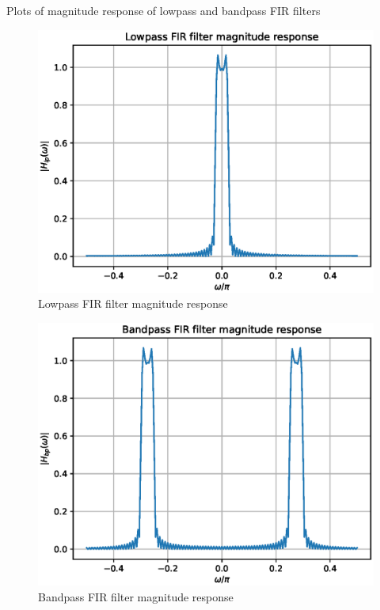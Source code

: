 \documentclass{beamer}
\begin{document}
\begin{frame}{Plots of magnitude response of lowpass and bandpass FIR filters}
\begin{figure}[!h]
\includegraphics[width=0.30\columnwidth]{./figs_fir/ee18btech11034_FIR_Lowpass.eps}
\caption{Lowpass FIR filter magnitude response}
\label{fig:Figure10}
\end{figure}

\begin{figure}[!h]
\includegraphics[width=0.30\columnwidth]{./figs_fir/ee18btech11034_FIR_Bandpass.eps}
\caption{Bandpass FIR filter magnitude response}
\label{fig:Figure11}
\end{figure}
\end{frame}
\end{document}

